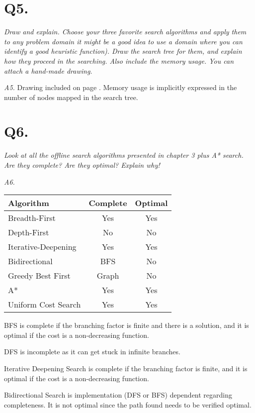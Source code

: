 \section{Q5.}
\em Draw and explain. Choose your three favorite search algorithms and apply them to any problem domain
    it might be a good idea to use a domain where you can identify a good heuristic function). Draw the
    search tree for them, and explain how they proceed in the searching. Also include the memory usage.
    You can attach a hand-made drawing.\em

    \emph{A5.} Drawing included on page \pageref{fig:a51}. Memory usage is implicitly expressed in the number
    of nodes mapped in the search tree.
     

\section{Q6.}
\em Look at all the offline search algorithms presented in chapter 3 plus A* search. Are they complete?
    Are they optimal? Explain why!\em

    \emph{A6.}

    \begin{tabular}{l|c|c}
      Algorithm & Complete & Optimal \\
      \hline
      Breadth-First & Yes & Yes \\
      Depth-First & No & No\\
      Iterative-Deepening & Yes & Yes\\
      Bidirectional & BFS & No\\
      Greedy Best First & Graph & No\\
      A* & Yes & Yes\\
      Uniform Cost Search & Yes & Yes
    \end{tabular}

    BFS is complete if the branching factor is finite and there is a solution, and it is optimal if the cost
    is a non-decreasing function.

    DFS is incomplete as it can get stuck in infinite branches.

    Iterative Deepening Search is complete if the branching factor is finite, and it is optimal if the cost is
    a non-decreasing function.

    Bidirectional Search is implementation (DFS or BFS) dependent regarding completeness. It is not optimal
    since the path found needs to be verified optimal.


